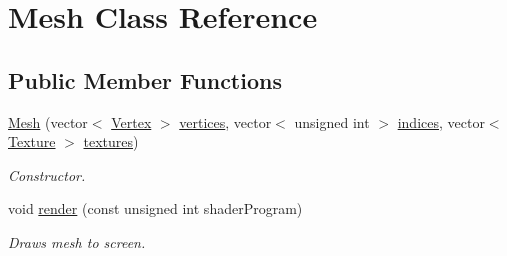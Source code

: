 \hypertarget{class_mesh}{\section{Mesh Class Reference}
\label{class_mesh}
}
\subsection*{Public Member Functions}
\begin{DoxyCompactItemize}
\item 
\hypertarget{class_mesh_a2d6c71adb66e5f270cee7a60c4e23018}{\hyperlink{class_mesh_a2d6c71adb66e5f270cee7a60c4e23018}{Mesh} (vector$<$ \hyperlink{struct_vertex}{Vertex} $>$ \hyperlink{class_mesh_abe5c05c224e47ba1e8b6393759798a9b}{vertices}, vector$<$ unsigned int $>$ \hyperlink{class_mesh_a464d9a1d7e7a4f67321dffc1e8b44b7d}{indices}, vector$<$ \hyperlink{struct_texture}{Texture} $>$ \hyperlink{class_mesh_a09bf4e8307bf7717c56501ca6293c6c0}{textures})}\label{class_mesh_a2d6c71adb66e5f270cee7a60c4e23018}

\begin{DoxyCompactList}\small\item\em Constructor. \end{DoxyCompactList}\item 
\hypertarget{class_mesh_a9a6ec018bec776cb7b31fb8433c8a7e7}{void \hyperlink{class_mesh_a9a6ec018bec776cb7b31fb8433c8a7e7}{render} (const unsigned int shader\+Program)}\label{class_mesh_a9a6ec018bec776cb7b31fb8433c8a7e7}

\begin{DoxyCompactList}\small\item\em Draws mesh to screen. \end{DoxyCompactList}\end{DoxyCompactItemize}
